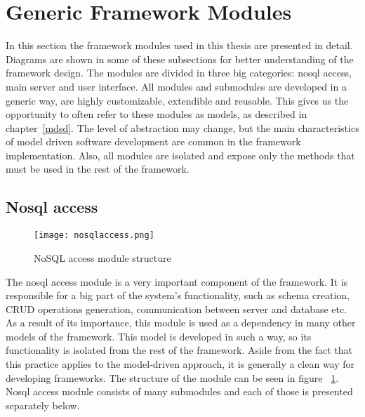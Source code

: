 \section{Generic Framework Modules}
In this section the framework modules used in this thesis are presented in detail. Diagrams are shown in some of these subsections for better understanding of the framework design. The modules are divided in three big categories: nosql access, main server and user interface. All modules and submodules are developed in a generic way, are highly customizable, extendible and reusable. This gives us the opportunity to often refer to these modules as models, as described in chapter~\ref{mdsd}. The level of abstraction may change, but the main characteristics of model driven software development are common in the framework implementation. Also, all modules are isolated and expose only the methods that must be used in the rest of the framework.


\subsection{Nosql access}
\label{nosql}
\begin{figure}
	\centerline{\texttt{[image: nosqlaccess.png]}}
	\caption{NoSQL access module structure}
	\label{nosqlaccess}
\end{figure}
The nosql access module is a very important component of the framework. It is responsible for a big part of the system's functionality, such as schema creation, CRUD operations generation, communication between server and database etc. As a result of its importance, this module is used as a dependency in many other models of the framework. This model is developed in such a way, so its functionality is isolated from the rest of the framework. Aside from the fact that this practice applies to the model-driven approach, it is generally a clean way for developing frameworks. The structure of the module can be seen in figure ~\ref{nosqlaccess}. Nosql access module consists of many submodules and each of those is presented separately below. 


